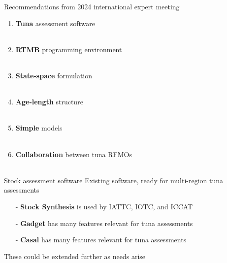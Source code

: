 \documentclass[aspectratio=169,fleqn]{beamer}
\begin{document}

\begin{frame}{Recommendations from 2024 international expert meeting}
  \begin{enumerate}
    \item {\darkgreen\bf Tuna} assessment software\\
    \\[1ex]
    \item {\darkgreen\bf RTMB} programming environment\\
    \\[1ex]
    \item {\darkgreen\bf State-space} formulation\\
    \\[1ex]
    \item {\darkgreen\bf Age-length} structure\\
    \\[1ex]
    \item {\darkgreen\bf Simple} models\\
    \\[1ex]
    \item {\darkgreen\bf Collaboration} between tuna RFMOs\\
    \\[1.5ex]
  \end{enumerate}
\end{frame}


\begin{frame}{Stock assessment software}
  Existing software, ready for multi-region tuna assessments\\[3ex]
  \begin{itemize}
    \item[-] {\darkgreen\bf Stock Synthesis} is used by IATTC, IOTC, and
    ICCAT\\[3ex]
    \item[-] {\darkgreen\bf Gadget} has many features relevant for tuna
    assessments\\[3ex]
    \item[-] {\darkgreen\bf Casal} has many features relevant for tuna
    assessments\\[4ex]
  \end{itemize}
  These could be extended further as needs arise\\[2ex]
\end{frame}
\end{document}
